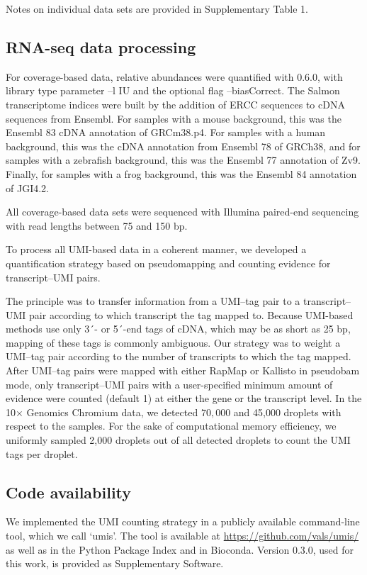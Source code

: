 Notes on individual data sets are provided in Supplementary Table 1.

\subsection{RNA-seq data processing}

For coverage-based data, relative abundances were quantified with  \cite{Patro2017-wf} 0.6.0, with library type parameter --l IU and the optional flag --biasCorrect. The Salmon transcriptome indices were built by the addition of ERCC sequences to cDNA sequences from Ensembl. For samples with a mouse background, this was the Ensembl 83 cDNA annotation of GRCm38.p4. For samples with a human background, this was the cDNA annotation from Ensembl 78 of GRCh38, and for samples with a zebrafish background, this was the Ensembl 77 annotation of Zv9. Finally, for samples with a frog background, this was the Ensembl 84 annotation of JGI4.2.

All coverage-based data sets were sequenced with Illumina paired-end sequencing with read lengths between 75 and 150 bp.

To process all UMI-based data in a coherent manner, we developed a quantification strategy based on pseudomapping and counting evidence for transcript–UMI pairs.

The principle was to transfer information from a UMI–tag pair to a transcript–UMI pair according to which transcript the tag mapped to. Because UMI-based methods use only 3´- or 5´-end tags of cDNA, which may be as short as 25 bp, mapping of these tags is commonly ambiguous. Our strategy was to weight a UMI–tag pair according to the number of transcripts to which the tag mapped. After UMI–tag pairs were mapped with either RapMap \cite{Srivastava2016-nx} or Kallisto \cite{Bray2016-dh} in pseudobam mode, only transcript–UMI pairs with a user-specified minimum amount of evidence were counted (default 1) at either the gene or the transcript level. In the 10× Genomics Chromium data, we detected \( 70,000 \) and 45,000 droplets with respect to the samples. For the sake of computational memory efficiency, we uniformly sampled 2,000 droplets out of all detected droplets to count the UMI tags per droplet.

\subsection{Code availability}

We implemented the UMI counting strategy in a publicly available command-line tool, which we call ‘umis’. The tool is available at \url{https://github.com/vals/umis/} as well as in the Python Package Index and in Bioconda. Version 0.3.0, used for this work, is provided as Supplementary Software.

